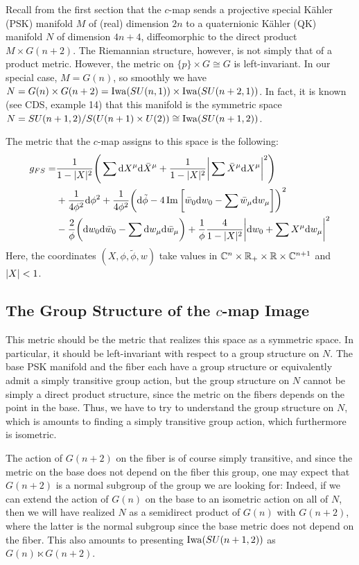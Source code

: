 \documentclass[parskip=half]{scrartcl}
\begin{document}
Recall from the first section that the $c$-map sends a projective special K\"ahler (PSK) manifold $M$ of (real) dimension $2n$ to a quaternionic K\"ahler (QK) manifold $N$ of dimension $4n+4$, diffeomorphic to the direct product $M\times G(n+2)$. The Riemannian structure, however, is not simply that of a product metric. However, the metric on $\{p\}\times G\cong G$ is left-invariant. In our special case, $M=G(n)$, so smoothly we have $N=G(n)\times G(n+2)=\operatorname{Iwa}(SU(n,1))\times \operatorname{Iwa}(SU(n+2,1))$. In fact, it is known (see CDS, example 14) that this manifold is the symmetric space $N=SU(n+1,2)/S(U(n+1)\times U(2))\cong\operatorname{Iwa}(SU(n+1,2))$. 

The metric that the $c$-map assigns to this space is the following:
\begin{align*}
	g_{FS}=&\frac{1}{1-\lvert X \rvert^2}\Bigg(\sum \mathrm{d} X^\mu \mathrm{d} \bar X^\mu 
	+ \frac{1}{1-\lvert X \rvert^2}\bigg|\sum \bar X^\mu \mathrm{d} X^\mu \bigg|^2\Bigg)\\
	&+\frac{1}{4\phi^2}\mathrm{d} \phi^2 
	+\frac{1}{4\phi^2}\bigg(\mathrm{d}\tilde\phi-4\operatorname{Im}\bigg[\bar w_0\mathrm{d} w_0 - \sum \bar w_\mu \mathrm{d} w_\mu\bigg]\bigg)^2\\
	&-\frac{2}{\phi} \bigg( \mathrm{d} w_0 \mathrm{d} \bar w_0 - \sum \mathrm{d} w_\mu \mathrm{d} \bar w_\mu \bigg)
	+\frac{1}{\phi}\frac{4}{1-\lvert X \rvert^2}\bigg|\mathrm{d} w_0 + \sum X^\mu \mathrm{d} w_\mu \bigg|^2
\end{align*}
Here, the coordinates $(X,\phi,\tilde\phi,w)$ take values in $\mathbb{C}^n\times \mathbb{R}_+\times \mathbb{R}\times \mathbb{C}^{n+1}$ and $\lvert X \rvert<1$.

\subsection{The Group Structure of the \texorpdfstring{$c$}{c}-map Image}

This metric should be the metric that realizes this space as a symmetric space. In particular, it should be left-invariant with respect to a group structure on $N$. The base PSK manifold and the fiber each have a group structure or equivalently admit a simply transitive group action, but the group structure on $N$ cannot be simply a direct product structure, since the metric on the fibers depends on the point in the base. Thus, we have to try to understand the group structure on $N$, which is amounts to finding a simply transitive group action, which furthermore is isometric. 

The action of $G(n+2)$ on the fiber is of course simply transitive, and since the metric on the base does not depend on the fiber this group, one may expect that $G(n+2)$ is a normal subgroup of the group we are looking for: Indeed, if we can extend the action of $G(n)$ on the base to an isometric action on all of $N$, then we will have realized $N$ as a semidirect product of $G(n)$ with $G(n+2)$, where the latter is the normal subgroup since the base metric does not depend on the fiber. This also amounts to presenting $\operatorname{Iwa}(SU(n+1,2))$ as $G(n)\ltimes G(n+2)$.
\end{document}
